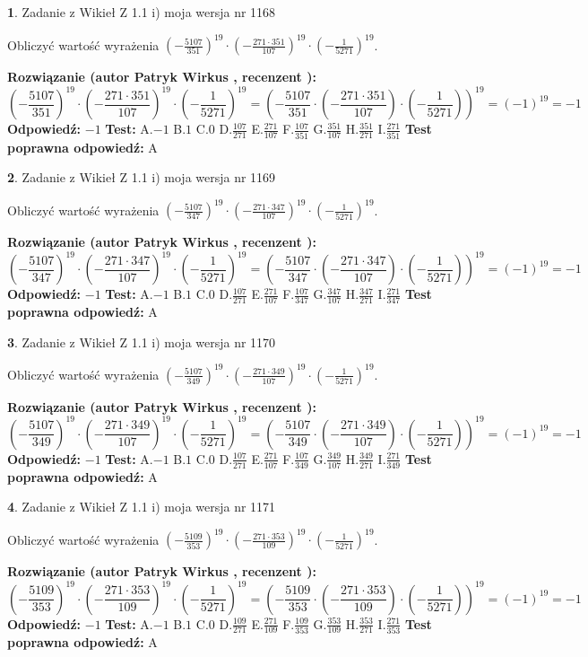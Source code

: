 \documentclass[12pt, a4paper]{article}
\theoremstyle{definition} %
\newtheorem{zad}{}
\newcommand{\zadStart}[1]{\begin{zad}#1\newline}
\newcommand{\zadStop}{\end{zad}}
\newcommand{\rozwStart}[2]{\noindent \textbf{Rozwiązanie (autor #1 , recenzent #2): }\newline}
\newcommand{\rozwStop}{\newline}
\newcommand{\odpStart}{\noindent \textbf{Odpowiedź:}\newline}
\newcommand{\odpStop}{\newline}
\newcommand{\testStart}{\noindent \textbf{Test:}\newline}
\newcommand{\testStop}{\newline}
\newcommand{\kluczStart}{\noindent \textbf{Test poprawna odpowiedź:}\newline}
\newcommand{\kluczStop}{\newline}
\begin{document}
\zadStart{Zadanie z Wikieł Z 1.1 i) moja wersja nr 1168}

Obliczyć wartość wyrażenia $(-\frac{5107}{351})^{19} \cdot (-\frac{271 \cdot 351}{107})^{19} \cdot (-\frac{1}{5271})^{19}$.
\zadStop
\rozwStart{Patryk Wirkus}{}
$$(-\frac{5107}{351})^{19} \cdot (-\frac{271 \cdot 351}{107})^{19} \cdot (-\frac{1}{5271})^{19} = (-\frac{5107}{351} \cdot (-\frac{271 \cdot 351}{107}) \cdot (-\frac{1}{5271}))^{19} = (-1)^{19} = -1$$
\rozwStop
\odpStart
$-1$
\odpStop
\testStart
A.$-1$ B.$1$ C.$0$ D.$\frac{107}{271}$ E.$\frac{271}{107}$
F.$\frac{107}{351}$ G.$\frac{351}{107}$
H.$\frac{351}{271}$
I.$\frac{271}{351}$
\testStop
\kluczStart
A
\kluczStop



\zadStart{Zadanie z Wikieł Z 1.1 i) moja wersja nr 1169}

Obliczyć wartość wyrażenia $(-\frac{5107}{347})^{19} \cdot (-\frac{271 \cdot 347}{107})^{19} \cdot (-\frac{1}{5271})^{19}$.
\zadStop
\rozwStart{Patryk Wirkus}{}
$$(-\frac{5107}{347})^{19} \cdot (-\frac{271 \cdot 347}{107})^{19} \cdot (-\frac{1}{5271})^{19} = (-\frac{5107}{347} \cdot (-\frac{271 \cdot 347}{107}) \cdot (-\frac{1}{5271}))^{19} = (-1)^{19} = -1$$
\rozwStop
\odpStart
$-1$
\odpStop
\testStart
A.$-1$ B.$1$ C.$0$ D.$\frac{107}{271}$ E.$\frac{271}{107}$
F.$\frac{107}{347}$ G.$\frac{347}{107}$
H.$\frac{347}{271}$
I.$\frac{271}{347}$
\testStop
\kluczStart
A
\kluczStop



\zadStart{Zadanie z Wikieł Z 1.1 i) moja wersja nr 1170}

Obliczyć wartość wyrażenia $(-\frac{5107}{349})^{19} \cdot (-\frac{271 \cdot 349}{107})^{19} \cdot (-\frac{1}{5271})^{19}$.
\zadStop
\rozwStart{Patryk Wirkus}{}
$$(-\frac{5107}{349})^{19} \cdot (-\frac{271 \cdot 349}{107})^{19} \cdot (-\frac{1}{5271})^{19} = (-\frac{5107}{349} \cdot (-\frac{271 \cdot 349}{107}) \cdot (-\frac{1}{5271}))^{19} = (-1)^{19} = -1$$
\rozwStop
\odpStart
$-1$
\odpStop
\testStart
A.$-1$ B.$1$ C.$0$ D.$\frac{107}{271}$ E.$\frac{271}{107}$
F.$\frac{107}{349}$ G.$\frac{349}{107}$
H.$\frac{349}{271}$
I.$\frac{271}{349}$
\testStop
\kluczStart
A
\kluczStop



\zadStart{Zadanie z Wikieł Z 1.1 i) moja wersja nr 1171}

Obliczyć wartość wyrażenia $(-\frac{5109}{353})^{19} \cdot (-\frac{271 \cdot 353}{109})^{19} \cdot (-\frac{1}{5271})^{19}$.
\zadStop
\rozwStart{Patryk Wirkus}{}
$$(-\frac{5109}{353})^{19} \cdot (-\frac{271 \cdot 353}{109})^{19} \cdot (-\frac{1}{5271})^{19} = (-\frac{5109}{353} \cdot (-\frac{271 \cdot 353}{109}) \cdot (-\frac{1}{5271}))^{19} = (-1)^{19} = -1$$
\rozwStop
\odpStart
$-1$
\odpStop
\testStart
A.$-1$ B.$1$ C.$0$ D.$\frac{109}{271}$ E.$\frac{271}{109}$
F.$\frac{109}{353}$ G.$\frac{353}{109}$
H.$\frac{353}{271}$
I.$\frac{271}{353}$
\testStop
\kluczStart
A
\kluczStop
\end{document}
